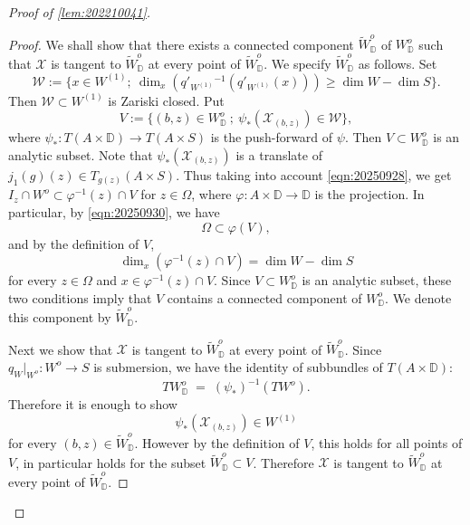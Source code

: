 \documentclass[11pt,english]{smfart}
\theoremstyle{plain}
\theoremstyle{definition}
\theoremstyle{remark}
\numberwithin{equation}{section}
\theoremstyle{plain}
\begin{document}
\begin{proof}[Proof of \cref{lem:202210041}]
\begin{proof}
We shall show that there exists a connected component $\widetilde W^o_{\mathbb D}$ of $W^o_{\mathbb D}$
such that $\mathcal{X}$ is tangent to $\widetilde W^o_{\mathbb D}$ at every point of
$\widetilde W^o_{\mathbb D}$. 
We specify $\widetilde W^o_{\mathbb D}$ as follows.
Set
\[
\mathcal W:=\{x\in W^{(1)};\ \dim_x (q'_{W^{(1)}}{}^{-1}(q'_{W^{(1)}}(x)))\ge \dim W-\dim S\}.
\]
Then $\mathcal W\subset W^{(1)}$ is Zariski closed.
Put
\[
V:=\{(b,z)\in W^o_{\mathbb D} \ ;\ \psi_*(\mathcal{X}_{(b,z)})\in\mathcal W\},
\]
where $\psi_*:T(A\times \mathbb D)\to T(A\times S)$ is the push-forward of $\psi$.
Then $V\subset W^o_{\mathbb D}$ is an analytic subset.
Note that $\psi_*(\mathcal{X}_{(b,z)})$ is a translate
of $j_1(g)(z)\in T_{g(z)}(A\times S)$.
Thus taking into account \eqref{eqn:20250928}, we get $I_z\cap W^o\subset \varphi^{-1}(z)\cap V$ for $z\in \Omega$, where $\varphi:A\times \mathbb D\to \mathbb D$ is the projection.
In particular, by \eqref{eqn:20250930}, we have 
$$\Omega\subset \varphi(V),$$ 
and by the definition of $V$,
$$\dim_x(\varphi^{-1}(z)\cap V)=\dim W-\dim S$$ 
for every $z\in \Omega$ and $x\in \varphi^{-1}(z)\cap V$.
Since $V\subset  W^o_{\mathbb D}$ is an analytic subset, these two conditions imply that $V$ contains a connected component of $W^o_{\mathbb D}$.
We denote this component by $\widetilde W^o_{\mathbb D}$.






Next we show that $\mathcal{X}$ is tangent to $\widetilde W^o_{\mathbb D}$ at every point of
$\widetilde W^o_{\mathbb D}$.
Since $q_W|_{W^o}:W^o\to S$ is submersion, we have the
identity of subbundles of $T(A\times \mathbb D)$:
\begin{equation*}
T W^o_{\mathbb D} \;=\; (\psi_*)^{-1}(T W^o).
\end{equation*}
Therefore it is enough to show
\begin{equation}\label{eq:TWod}
\psi_*(\mathcal{X}_{(b,z)})\in W^{(1)}
\end{equation}
for every $(b,z)\in\widetilde W^o_{\mathbb D}$.
However by the definition of $V$, this holds for all points of $V$, in particular holds for the subset $\widetilde W^o_{\mathbb D}\subset V$.
Therefore $\mathcal{X}$ is tangent to $\widetilde W^o_{\mathbb D}$ at every point of $\widetilde W^o_{\mathbb D}$.


\end{proof}
\end{proof}
\end{document}
